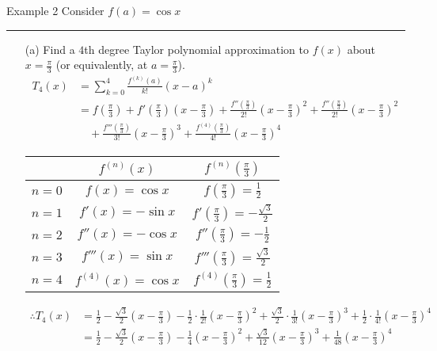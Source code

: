 \documentclass[12pt,a4paper]{article}
\begin{document}
\begin{eg}{Example 2}
	Consider $f(a)=\cos{x}$\\
	\noindent\rule[0.25\baselineskip]{\textwidth}{1pt}
	\begin{enumerate}
		\item[(a)] Find a $4$th degree Taylor polynomial approximation to $f(x)$ about $\displaystyle x=\frac{\pi}{3}$ (or equivalently, at $\displaystyle a=\frac{\pi}{3}$).\\
		$$\begin{aligned}
			T_4(x)&=\sum^4_{k=0}\frac{f^{(k)}(a)}{k!}(x-a)^k\\
			&=f\left(\frac{\pi}{3}\right)+f'\left(\frac{\pi}{3}\right)\left(x-\frac{\pi}{3}\right)+\frac{f''\left(\frac{\pi}{3}\right)}{2!}\left(x-\frac{\pi}{3}\right)^2+\frac{f''\left(\frac{\pi}{3}\right)}{2!}\left(x-\frac{\pi}{3}\right)^2\\
			&\quad+\frac{f'''\left(\frac{\pi}{3}\right)}{3!}\left(x-\frac{\pi}{3}\right)^3+\frac{f^{(4)}\left(\frac{\pi}{3}\right)}{4!}\left(x-\frac{\pi}{3}\right)^4
		\end{aligned}$$
		\begin{center}
			\begin{tabular}{c|c|c}
				&$f^{(n)}(x)$ & $f^{(n)}\left(\frac{\pi}{3}\right)$\\
				\hline
				$n=0$&$f(x)=\cos{x}$&$f\left(\frac{\pi}{3}\right)=\frac{1}{2}$\\
				$n=1$&$f'(x)=-\sin{x}$&$f'\left(\frac{\pi}{3}\right)=-\frac{\sqrt{3}}{2}$\\
				$n=2$&$f''(x)=-\cos{x}$&$f''\left(\frac{\pi}{3}\right)=-\frac{1}{2}$\\
				$n=3$&$f'''(x)=\sin{x}$&$f'''\left(\frac{\pi}{3}\right)=\frac{\sqrt{3}}{2}$\\
				$n=4$&$f^{(4)}(x)=\cos{x}$&$f^{(4)}\left(\frac{\pi}{3}\right)=\frac{1}{2}$
			\end{tabular}
		\end{center}
		$$\begin{aligned}
			\therefore T_4(x)&=\frac{1}{2}-\frac{\sqrt{3}}{2}\left(x-\frac{\pi}{3}\right)-\frac{1}{2}\cdot\frac{1}{2!}\left(x-\frac{\pi}{3}\right)^2+\frac{\sqrt{3}}{2}\cdot\frac{1}{3!}\left(x-\frac{\pi}{3}\right)^3+\frac{1}{2}\cdot\frac{1}{4!}\left(x-\frac{\pi}{3}\right)^4\\
			&\boxed{=\frac{1}{2}-\frac{\sqrt{3}}{2}\left(x-\frac{\pi}{3}\right)-\frac{1}{4}\left(x-\frac{\pi}{3}\right)^2+\frac{\sqrt{3}}{12}\left(x-\frac{\pi}{3}\right)^3+\frac{1}{48}\left(x-\frac{\pi}{3}\right)^4}
		\end{aligned}$$

\end{enumerate}
\end{eg}
\end{document}
